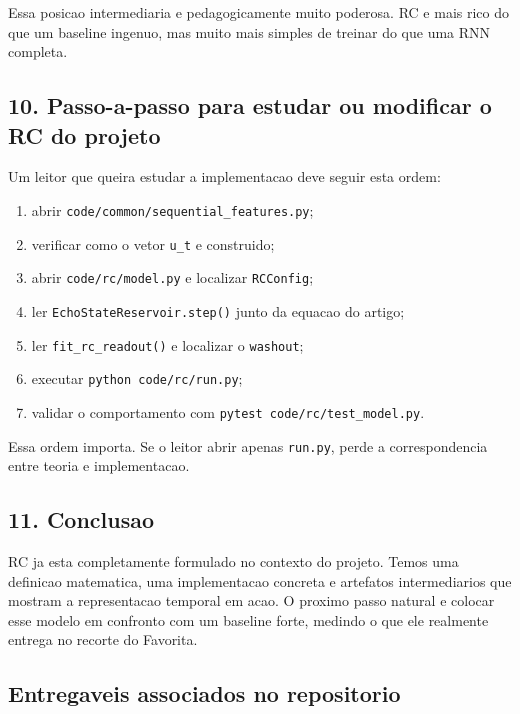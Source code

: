 \documentclass[12pt]{article}
\providecommand{\tightlist}{%
          \setlength{\itemsep}{0pt}\setlength{\parskip}{0pt}}
\begin{document}
Essa posicao intermediaria e pedagogicamente muito poderosa. RC e mais rico do que um baseline ingenuo, mas muito mais simples de treinar do que uma RNN completa.

\subsection{10. Passo-a-passo para estudar ou modificar o RC do projeto}\label{10-passo-a-passo-para-estudar-ou-modificar-o-rc-do-projeto}

Um leitor que queira estudar a implementacao deve seguir esta ordem:

\begin{enumerate}
\def\labelenumi{\arabic{enumi}.}
\tightlist
\item
  abrir \texttt{code/common/sequential\_features.py};
\item
  verificar como o vetor \texttt{u\_t} e construido;
\item
  abrir \texttt{code/rc/model.py} e localizar \texttt{RCConfig};
\item
  ler \texttt{EchoStateReservoir.step()} junto da equacao do artigo;
\item
  ler \texttt{fit\_rc\_readout()} e localizar o \texttt{washout};
\item
  executar \texttt{python\ code/rc/run.py};
\item
  validar o comportamento com \texttt{pytest\ code/rc/test\_model.py}.
\end{enumerate}

Essa ordem importa. Se o leitor abrir apenas \texttt{run.py}, perde a correspondencia entre teoria e implementacao.

\subsection{11. Conclusao}\label{11-conclusao}

RC ja esta completamente formulado no contexto do projeto. Temos uma definicao matematica, uma implementacao concreta e artefatos intermediarios que mostram a representacao temporal em acao. O proximo passo natural e colocar esse modelo em confronto com um baseline forte, medindo o que ele realmente entrega no recorte do Favorita.

\subsection{Entregaveis associados no repositorio}\label{entregaveis-associados-no-repositorio}
\end{document}

